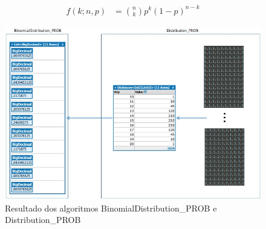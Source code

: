 \begin{apendicesenv}
\begin{align*}
	f(k;n,p) &= \binom{n}{k} p^k(1 - p)^{n-k}
	\end{align*}
	\begin{figure}[H]
	\caption{Resultado dos algoritmos  BinomialDistribution\_PROB e Distribution\_PROB}
	\label{fig:BinomialDistribution_PROB_and_Distribution_PROB}
	\centering
	\includegraphics[scale=.77]{sections/images/BinomialDistribution_PROB_and_Distribution_PROB.jpg}
	\end{figure}


\end{apendicesenv}
